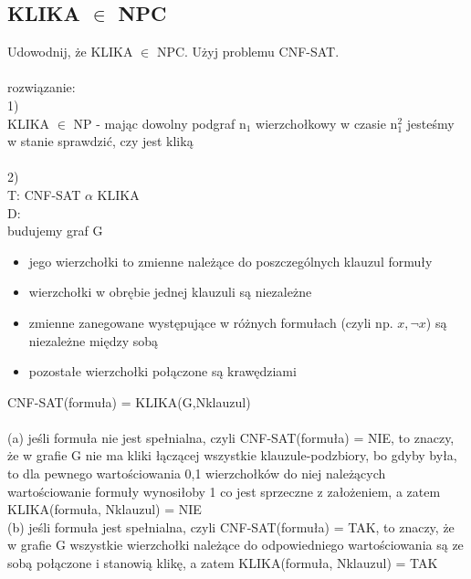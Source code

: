 \documentclass{article}
\begin{document}
\subsection*{KLIKA $\in$ NPC}
Udowodnij, że KLIKA $\in$ NPC. Użyj problemu CNF-SAT. \\\\
rozwiązanie:\\
1)\\
KLIKA $\in$ NP - mając dowolny podgraf n$_1$ wierzchołkowy w czasie n$_1^2$ jesteśmy w stanie sprawdzić, czy jest kliką\\\\
2)\\
T: CNF-SAT $\alpha$ KLIKA \\
D: \\
budujemy graf G
\begin{itemize}
	\item jego wierzchołki to zmienne należące do poszczególnych klauzul formuły
	\item wierzchołki w obrębie jednej klauzuli są niezależne
	\item zmienne zanegowane występujące w różnych formułach (czyli np. $x, \neg x$) są niezależne między sobą
	\item pozostałe wierzchołki połączone są krawędziami
\end{itemize}
CNF-SAT(formuła) = KLIKA(G,Nklauzul) \\\\
(a) jeśli formuła nie jest spełnialna, czyli CNF-SAT(formuła) = NIE, to znaczy, że w grafie G nie ma kliki łączącej 
wszystkie klauzule-podzbiory, bo gdyby była, to dla pewnego wartościowania 0,1 wierzchołków do niej należących
wartościowanie formuły wynosiłoby 1 co jest sprzeczne z założeniem,  a zatem KLIKA(formuła, Nklauzul) = NIE \\
(b) jeśli formuła jest spełnialna, czyli CNF-SAT(formuła) = TAK, to znaczy, że w grafie G wszystkie wierzchołki należące
do odpowiedniego wartościowania są ze sobą połączone i stanowią klikę, a zatem KLIKA(formuła, Nklauzul) = TAK
\end{document}

